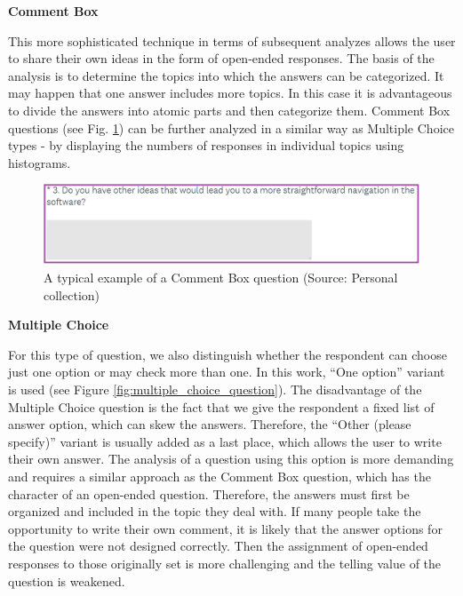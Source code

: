 \documentclass[a4paper,10pt,twoside]{article}
\begin{document}
\smallskip
\vspace*{-0.5cm}
\noindent \textbf {Comment Box}

\noindent This more sophisticated technique in terms of subsequent analyzes allows the user to share their own ideas in the form of open-ended responses. The basis of the analysis is to determine the topics into which the answers can be categorized. It may happen that one answer includes more topics.  In this case it is advantageous to divide the answers into atomic parts and then categorize them. Comment Box questions (see Fig. \ref{fig:comment_box_question}) can be further analyzed in a similar way as Multiple Choice types - by displaying the numbers of responses in individual topics using histograms.

\vspace{0.3cm}
\begin{figure}[hbt!] 
\begin{center}
\includegraphics[width=15cm]{../pictures/comment_box_question.png} 
\caption[A typical example of a Comment Box question]{A typical example of a Comment Box question (Source: Personal collection)}
\label{fig:comment_box_question}
\end{center}
\end{figure}

\smallskip
\vspace*{-0.5cm}
\noindent \textbf {Multiple Choice}

\noindent For this type of question, we also distinguish whether the respondent can choose just one option or may check more than one. In this work, ``One option'' variant is used (see Figure \ref{fig:multiple_choice_question}). The disadvantage of the Multiple Choice question is the fact that we give the respondent a fixed list of answer option, which can skew the answers. Therefore, the ``Other (please specify)'' variant is usually added as a last place, which allows the user to write their own answer. The analysis of a question using this option is more demanding and requires a similar approach as the Comment Box question, which has the character of an open-ended question. Therefore, the answers must first be organized and included in the topic they deal with. If many people take the opportunity to write their own comment, it is likely that the answer options for the question were not designed correctly. Then the assignment of open-ended responses to those originally set is more challenging and the telling value of the question is weakened.
\end{document}
